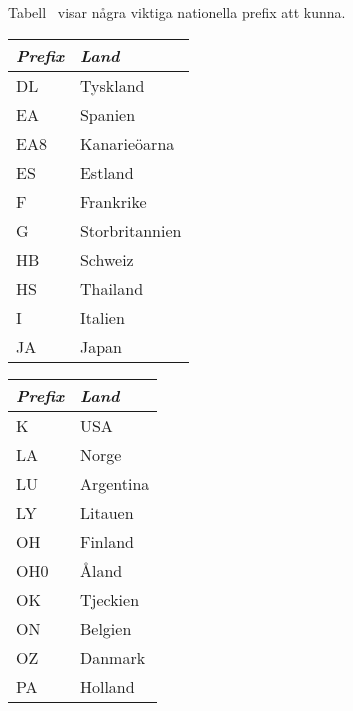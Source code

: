 Tabell~ visar några viktiga nationella prefix att kunna.

\begin{table*}[ht]
  \begin{center}
    \begin{minipage}{.3\linewidth}
      \begin{tabular}{ll}
        \emph{Prefix} & \emph{Land} \\
        \hline
        DL            & Tyskland    \\
        EA            & Spanien        \\
        EA8           & Kanarieöarna   \\
        ES            & Estland     \\
        F             & Frankrike   \\
        G             & Storbritannien \\
        HB            & Schweiz     \\
        HS            & Thailand    \\
        I             & Italien     \\
        JA            & Japan          \\
      \end{tabular}
    \end{minipage}
    \begin{minipage}{.3\linewidth}
      \begin{tabular}{ll}
        \emph{Prefix} & \emph{Land} \\
        \hline
        K             & USA         \\
        LA            & Norge       \\
        LU            & Argentina      \\
        LY            & Litauen        \\
        OH            & Finland     \\
        OH0           & Åland          \\
        OK            & Tjeckien    \\
        ON            & Belgien     \\
        OZ            & Danmark     \\
        PA            & Holland        \\
      \end{tabular}
    \end{minipage}
    \begin{minipage}{.3\linewidth}

\end{minipage}
\end{center}
\end{table*}
